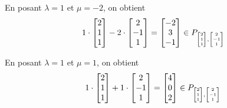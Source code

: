En posant $\lambda = 1$ et $\mu = -2$, on obtient
\[
    1 \cdot \begin{bmatrix}2\\1\\1\end{bmatrix} - 2 \cdot \begin{bmatrix}2\\-1\\1\end{bmatrix} = \begin{bmatrix}-2\\3\\-1\end{bmatrix} \in P_{\tiny \begin{bmatrix}2\\1\\1\end{bmatrix},\begin{bmatrix}2\\-1\\1\end{bmatrix}}
\]

En posant $\lambda = 1$ et $\mu = 1$, on obtient
\[
 1 \cdot \begin{bmatrix}2\\1\\1\end{bmatrix} + 1 \cdot \begin{bmatrix}2\\-1\\1\end{bmatrix} = \begin{bmatrix}4\\0\\2\end{bmatrix} \in P_{\tiny \begin{bmatrix}2\\1\\1\end{bmatrix},\begin{bmatrix}2\\-1\\1\end{bmatrix}}
\]

